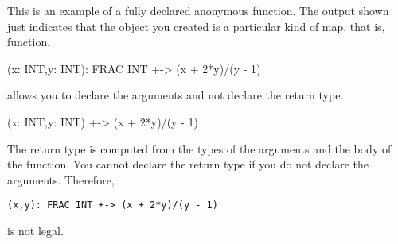 \begin{xtc}
\begin{xtccomment}
This is an example of a fully declared anonymous
function.
The output shown just indicates that the object you created is a
particular kind of map, that is, function.
\end{xtccomment}
\begin{spadsrc}
(x: INT,y: INT): FRAC INT +-> (x + 2*y)/(y - 1)
\end{spadsrc}
\begin{TeXOutput}
\begin{fricasmath}{1}
%
\end{fricasmath}
\end{TeXOutput}
\end{xtc}
\begin{xtc}
\begin{xtccomment}
\Language{} allows you to declare the arguments and not declare
the return type.
\end{xtccomment}
\begin{spadsrc}
(x: INT,y: INT) +-> (x + 2*y)/(y - 1)
\end{spadsrc}
\begin{TeXOutput}
\begin{fricasmath}{2}
%
\end{fricasmath}
\end{TeXOutput}
\end{xtc}
The return type is computed from the types of the arguments and the
body of the function.
You cannot declare the return type if you do not declare the arguments.
Therefore,
\begin{verbatim}
(x,y): FRAC INT +-> (x + 2*y)/(y - 1)
\end{verbatim}
is not legal.

